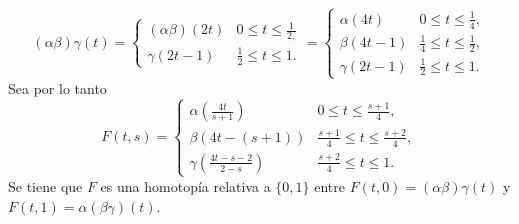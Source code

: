 \documentclass[bibtex, anon]{TEMat-article}
\begin{document}
\begin{demostracion}
\begin{enumerate}
		$$(\alpha\beta)\gamma(t)=\left\{\begin{array}{lc}
		(\alpha\beta)(2t) & 0\leq t\leq\frac{1}{2,}\\
		\gamma(2t-1) & \frac{1}{2}\leq t\leq 1.
		\end{array}\right.=\left\{\begin{array}{lc}
		\alpha(4t) & 0\leq t\leq\frac{1}{4},\\
		\beta(4t-1) & \frac{1}{4}\leq t\leq\frac{1}{2},\\
		\gamma(2t-1) & \frac{1}{2}\leq t\leq 1.
		\end{array}\right. $$
		Sea por lo tanto
		\[
		F(t,s)=\left\{\begin{array}{lcc}
		\alpha\left(\frac{4t}{s+1}\right)  & 0\leq t\leq\frac{s+1}{4},\\
		\beta\left(4t-(s+1)\right) &  \frac{s+1}{4}\leq t\leq\frac{s+2}{4},\\
		\gamma\left(\frac{4t-s-2}{2-s}\right) & \frac{s+2}{4}\leq t\leq 1.
		\end{array}\right.
		\]
		Se tiene que $F$ es una homotopía relativa a $\{0,1\}$ entre $F(t,0)=(\alpha\beta)\gamma(t)$ y $F(t,1)=\alpha(\beta\gamma)(t)$.
		

\end{enumerate}
\end{demostracion}
\end{document}
